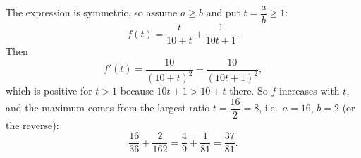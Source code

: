 The expression is symmetric, so assume $a\ge b$ and put $t=\dfrac {a}{b}\ge1$:
\[
f(t)=\dfrac{t}{10+t}+\dfrac{1}{10t+1}.
\]
Then
\[
f'(t)=\dfrac{10}{(10+t)^2}-\dfrac{10}{(10t+1)^2},
\]
which is positive for $t>1$ because $10t+1>10+t$ there. So $f$ increases with $t$, and the maximum comes from the largest ratio $t=\dfrac{16}{2}=8$, i.e.\ $a=16$, $b=2$ (or the reverse):
\[
\dfrac{16}{36}+\dfrac{2}{162}=\dfrac{4}{9}+\dfrac{1}{81}=\boxed{\dfrac{37}{81}}.
\]
